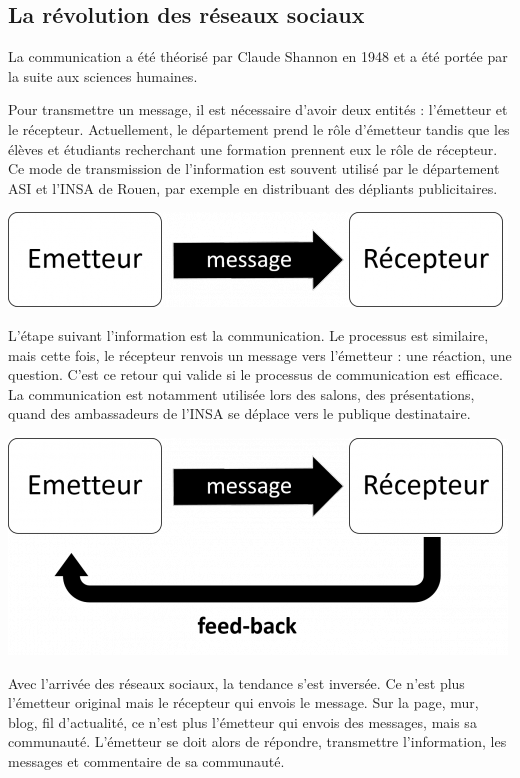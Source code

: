 \subsection{La révolution des réseaux sociaux}
La communication a été théorisé par Claude Shannon en 1948 et a été portée par la suite aux sciences humaines.

Pour transmettre un message, il est nécessaire d'avoir deux entités : l'émetteur et le récepteur. Actuellement, le département prend le rôle d'émetteur tandis que les élèves et étudiants recherchant une formation prennent eux le rôle de récepteur. Ce mode de transmission de l'information est souvent utilisé par le département ASI et l'INSA de Rouen, par exemple en distribuant des dépliants publicitaires.

\begin{center}
\includegraphics[scale=0.5]{./image/information.png}
\end{center}

L'étape suivant l'information est la communication. Le processus est similaire, mais cette fois, le récepteur renvois un message vers l'émetteur : une réaction, une question. C'est ce retour qui valide si le processus de communication est efficace. La communication est notamment utilisée lors des salons, des présentations, quand des ambassadeurs de l'INSA se déplace vers le publique destinataire.

\begin{center}
\includegraphics[scale=0.5]{./image/communication.png}
\end{center}

Avec l'arrivée des réseaux sociaux, la tendance s'est inversée. Ce n'est plus l'émetteur original mais le récepteur qui envois le message. Sur la page, mur, blog, fil d'actualité, ce n'est plus l'émetteur qui envois des messages, mais sa communauté. L'émetteur se doit alors de répondre, transmettre l'information, les messages et commentaire de sa communauté.

